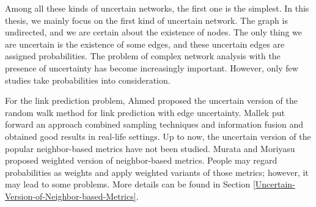 \documentclass[\main/thesis.tex]{subfiles}
\begin{document}
Among all these kinds of uncertain networks, the first one is the simplest. In this thesis, we mainly focus on the first kind of uncertain network. The graph is undirected, and we are certain about the existence of nodes. The only thing we are uncertain is the existence of some edges, and these uncertain edges are assigned probabilities. The problem of complex network analysis with the presence of uncertainty has become increasingly important. However, only few studies take probabilities into consideration.


For the link prediction problem, Ahmed \cite{ahmed2016efficient} proposed the uncertain version of the random walk method for link prediction with edge uncertainty. Mallek \cite{mallek2016evidential} put forward an approach combined sampling techniques and information fusion and obtained good results in real-life settings. Up to now, the uncertain version of the popular neighbor-based metrics have not been studied. Murata and Moriyasu \cite{murata2007link} proposed weighted version of neighbor-based metrics. People may regard probabilities as weights and apply weighted variants of those metrics; however, it may lead to some problems. More details can be found in Section \ref{Uncertain-Version-of-Neighbor-based-Metrics}.
\end{document}

